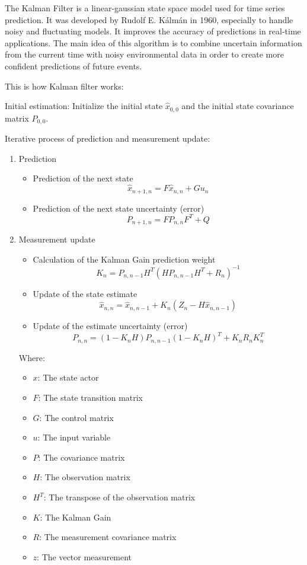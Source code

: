 \documentclass[conference]{IEEEtran}
\begin{document}
The Kalman Filter is a linear-gaussian state space model used for time series prediction. It was developed by Rudolf E. Kálmán in 1960, especially to handle noisy and fluctuating models. It improves the accuracy of predictions in real-time applications. The main idea of this algorithm is to combine uncertain information from the current time with noisy environmental data in order to create more confident predictions of future events.

This is how Kalman filter works:

Initial estimation: Initialize the initial state $\widehat{x}_{0,0}$ and the initial state covariance matrix $P_{0,0}$.

Iterative process of prediction and measurement update:

\begin{enumerate}
    \item Prediction
    \begin{itemize}
        \item Prediction of the next state
        \[ \widehat{x}_{n + 1, n} = F\widehat{x}_{n, n} + Gu_{n} \]
        \item Prediction of the next state uncertainty (error)
        \[ P_{n + 1, n} = FP_{n, n}F^{T} + Q \]
    \end{itemize}
    \item Measurement update
    \begin{itemize}
        \item Calculation of the Kalman Gain prediction weight
        \[ K_{n} = P_{n, n - 1}H^{T}(HP_{n, n - 1}H^{T} + R_{n})^{-1} \]
        \item Update of the state estimate
        \[ \widehat{x}_{n, n} = \widehat{x}_{n, n - 1} + K_{n}(Z_{n} - H\widehat{x}_{n, n - 1}) \]
        \item Update of the estimate uncertainty (error)
        \[ P_{n, n} = (1 - K_{n}H)P_{n, n - 1}(1 - K_{n}H)^{T} + K_{n}R_{n}K_{n}^{T} \]
    \end{itemize}

Where:
    \begin{itemize}
        \item $x$: The state actor
        \item $F$: The state transition matrix
        \item $G$: The control matrix
        \item $u$: The input variable
        \item $P$: The covariance matrix
        \item $H$: The observation matrix
        \item ${H}^{T}$: The transpose of the observation matrix
        \item $K$: The Kalman Gain
        \item $R$: The measurement covariance matrix
        \item $z$: The vector measurement
    \end{itemize}
\end{enumerate}
\end{document}
